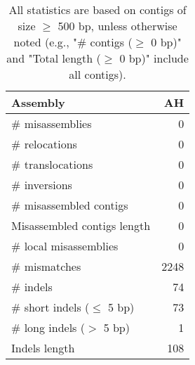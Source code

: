 \documentclass[12pt,a4paper]{article}
\begin{document}
\begin{table}[ht]
\begin{center}
\caption{All statistics are based on contigs of size $\geq$ 500 bp, unless otherwise noted (e.g., "\# contigs ($\geq$ 0 bp)" and "Total length ($\geq$ 0 bp)" include all contigs).}
\begin{tabular}{|l*{1}{|r}|}
\hline
Assembly & AH \\ \hline
\# misassemblies & 0 \\ \hline
\hspace{5mm}\# relocations & 0 \\ \hline
\hspace{5mm}\# translocations & 0 \\ \hline
\hspace{5mm}\# inversions & 0 \\ \hline
\# misassembled contigs & 0 \\ \hline
Misassembled contigs length & 0 \\ \hline
\# local misassemblies & 0 \\ \hline
\# mismatches & 2248 \\ \hline
\# indels & 74 \\ \hline
\hspace{5mm}\# short indels ($\leq$ 5 bp) & 73 \\ \hline
\hspace{5mm}\# long indels ($>$ 5 bp) & 1 \\ \hline
Indels length & 108 \\ \hline
\end{tabular}
\end{center}
\end{table}
\end{document}
